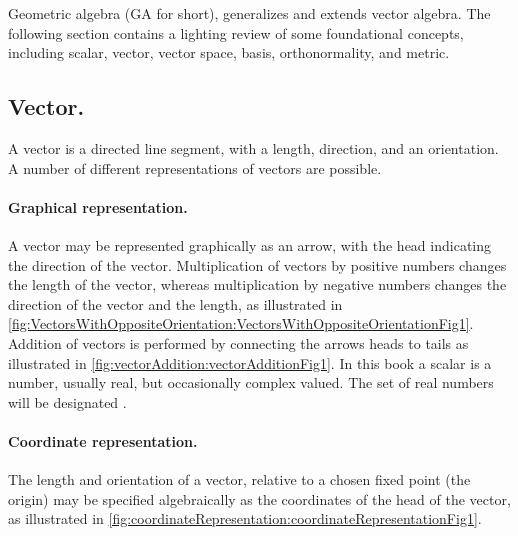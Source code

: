 %
%
Geometric algebra (GA for short), generalizes and extends vector algebra.
The following section contains a lighting review of some
foundational concepts, including
scalar, vector, vector space, basis, orthonormality, and metric.

\subsection{Vector.}

A vector is a directed line segment, with a length, direction, and an orientation.  A number of different representations of vectors are possible.

\paragraph{Graphical representation.}

A vector may be represented graphically as an arrow, with the head indicating the direction of the vector.
Multiplication of vectors by positive numbers changes the length of the vector, whereas multiplication by negative numbers changes the direction of the vector and the length, as illustrated in
\cref{fig:VectorsWithOppositeOrientation:VectorsWithOppositeOrientationFig1}.
Addition of vectors is performed by connecting the arrows heads to tails as illustrated in
\cref{fig:vectorAddition:vectorAdditionFig1}.
\index{\bbR}
In this book a scalar is a number, usually real, but occasionally complex valued.  The set of real numbers will be designated \bbR.

\paragraph{Coordinate representation.}

The length and orientation of a vector, relative to a chosen fixed point (the origin) may be specified algebraically as the coordinates of the head of the vector, as
illustrated in \cref{fig:coordinateRepresentation:coordinateRepresentationFig1}.


